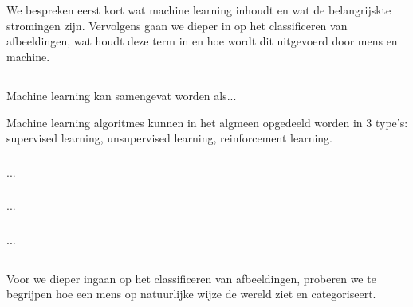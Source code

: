 \chapter{}
\label{ch:stand-van-zaken}


We bespreken eerst kort wat machine learning inhoudt en wat de belangrijskte stromingen zijn. Vervolgens gaan we dieper in op het classificeren van afbeeldingen, wat houdt deze term in en hoe wordt dit uitgevoerd door mens en machine.

\section{}
\label{sec:machine-learning}
Machine learning kan samengevat worden als...

Machine learning algoritmes kunnen in het algmeen opgedeeld worden in 3 type's: supervised learning, unsupervised learning, reinforcement learning.

\subsection{}
\label{sec:supervised-learning}
...
\subsection{}
\label{sec:unsupervised-learning}
...
\subsection{}
\label{sec:reinforcement-learning}
...

\section{}
\label{sec:classificeren-van-afbeeldingen}
Voor we dieper ingaan op het classificeren van afbeeldingen, proberen we te begrijpen hoe een mens op natuurlijke wijze de wereld ziet en categoriseert. 

